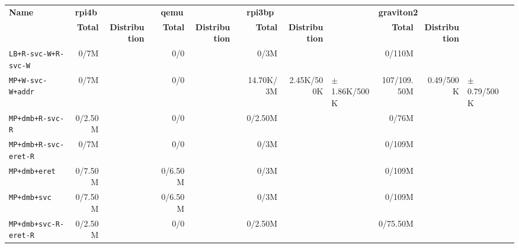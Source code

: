 \begin{tabular}{l  | r r l | r r l | r r l | r r l l}
   \textbf{Name}                  & \multicolumn{3}{l}{\textbf{rpi4b}}                       & \multicolumn{3}{l}{\textbf{qemu}}        & \multicolumn{3}{l}{\textbf{rpi3bp}}                         & \multicolumn{3}{l}{\textbf{graviton2}}                        & \\
                                  & \textbf{Total} & \textbf{Distribution} &                 & \textbf{Total} & \textbf{Distribution} &  & \textbf{Total} & \textbf{Distribution} &                   & \textbf{Total} & \textbf{Distribution} &                  & \\
        \verb|LB+R-svc-W+R-svc-W| &           0/7M &                       &                 &            0/0 &                       &  &           0/3M &                       &                   &         0/110M &                       &                  & \\ \hline 
           \verb|MP+W-svc-W+addr| &           0/7M &                       &                 &            0/0 &                       &  &      14.70K/3M &            2.45K/500K &  $\pm$ 1.86K/500K &    107/109.50M &             0.49/500K &  $\pm$ 0.79/500K & \\ \hline 
            \verb|MP+dmb+R-svc-R| &        0/2.50M &                       &                 &            0/0 &                       &  &        0/2.50M &                       &                   &          0/76M &                       &                  & \\ \hline 
       \verb|MP+dmb+R-svc-eret-R| &           0/7M &                       &                 &            0/0 &                       &  &           0/3M &                       &                   &         0/109M &                       &                  & \\ \hline 
               \verb|MP+dmb+eret| &        0/7.50M &                       &                 &        0/6.50M &                       &  &           0/3M &                       &                   &         0/109M &                       &                  & \\ \hline 
                \verb|MP+dmb+svc| &        0/7.50M &                       &                 &        0/6.50M &                       &  &           0/3M &                       &                   &         0/109M &                       &                  & \\ \hline 
       \verb|MP+dmb+svc-R-eret-R| &        0/2.50M &                       &                 &            0/0 &                       &  &        0/2.50M &                       &                   &       0/75.50M &                       &                  & \\ \hline 

\end{tabular}
